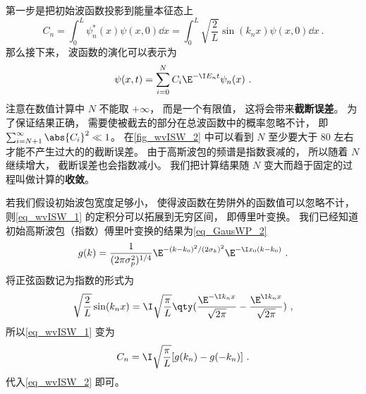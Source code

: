 第一步是把初始波函数投影到能量本征态上
\begin{equation}\label{eq_wvISW_1}
C_n = \int_0^L \psi _n^*(x) \psi (x,0) \dd{x}
= \int_0^L \sqrt{\frac{2}{L}} \sin(k_n x) \psi (x,0) \dd{x}~.
\end{equation}
那么接下来， 波函数的演化可以表示为
\begin{equation}\label{eq_wvISW_2}
\psi (x,t) = \sum _{i=0}^N C_i \E^{-\I E_n t} \psi _n(x)~.
\end{equation}
注意在数值计算中 $N$ 不能取 $+\infty$， 而是一个有限值， 这将会带来\textbf{截断误差}。 为了保证结果正确， 需要使被截去的部分在总波函数中的概率忽略不计， 即 $\sum_{i=N+1}^\infty \abs{C_i}^2 \ll 1$。 在\autoref{fig_wvISW_2} 中可以看到 $N$ 至少要大于 80 左右才能不产生过大的的截断误差。 由于高斯波包的频谱是指数衰减的， 所以随着 $N$ 继续增大， 截断误差也会指数减小。 我们把计算结果随 $N$ 变大而趋于固定的过程叫做计算的\textbf{收敛}。

若我们假设初始波包宽度足够小， 使得波函数在势阱外的函数值可以忽略不计， 则\autoref{eq_wvISW_1} 的定积分可以拓展到无穷区间， 即傅里叶变换。 我们已经知道初始高斯波包（指数）傅里叶变换的结果为\autoref{eq_GausWP_2} 
\begin{equation}
g(k) = \frac{1}{(2\pi \sigma _p^2)^{1/4}} \E^{-(k - k_0)^2/(2\sigma _k)^2} \E^{-\I x_0(k - k_0)}~.
\end{equation}
将正弦函数记为指数的形式为
\begin{equation}
\sqrt{\frac{2}{L}} \sin(k_n x) = \I \sqrt{\frac{\pi }{L}} \qty(\frac{\E^{-\I k_n x}}{\sqrt{2\pi }} - \frac{\E^{\I k_n x}}{\sqrt{2\pi }})~,
\end{equation}
所以\autoref{eq_wvISW_1} 变为
\begin{equation}
C_n = \I \sqrt{\frac{\pi }{L}} [g(k_n) - g(-k_n)]~.
\end{equation}
代入\autoref{eq_wvISW_2} 即可。

